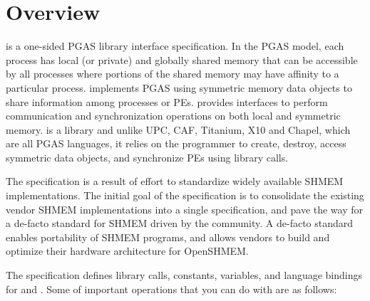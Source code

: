\section{Overview}
\openshmem{} is a one-sided \ac{PGAS} library interface specification. In the \ac{PGAS} model, each process has local (or private) and 
globally shared memory that can be accessible by all processes where portions of the shared memory may have affinity to a particular process. 
\openshmem{} implements \ac{PGAS} using symmetric memory data objects to share information among processes or \ac{PE}s.   
\openshmem{} provides interfaces to perform communication and synchronization operations on both local and symmetric memory. 
\openshmem{} is a library and unlike UPC, CAF, Titanium, X10 and Chapel, which are all
PGAS languages, it relies on the programmer to create, destroy, access symmetric data objects, and synchronize \ac{PE}s using library calls.

The \openshmem specification is a result of effort to standardize widely available SHMEM implementations. 
The initial goal of the specification is to consolidate the existing vendor SHMEM implementations into a single specification, and  pave the way for 
a de-facto standard for SHMEM driven by the \openshmem community. A de-facto standard enables portability of SHMEM programs, and 
allows vendors to build and optimize their hardware architecture for OpenSHMEM.

The \openshmem{} specification defines library calls, constants, variables, and language bindings for \Clang{} and \Fortran{}.
Some of important \openshmem{} operations that you can do with \openshmem are as follows:

